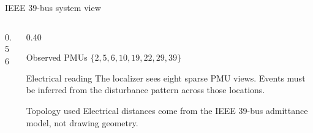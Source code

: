 \documentclass[aspectratio=169,10pt,t]{beamer}
\begin{document}
\begin{frame}{IEEE 39-bus system view}
\begin{columns}[T,totalwidth=\textwidth]
\begin{column}{0.56\textwidth}
{
}
\end{column}
\begin{column}{0.40\textwidth}
\scriptsize
\begin{block}{Observed PMUs}
\centering $\{2,5,6,10,19,22,29,39\}$
\end{block}
\begin{exampleblock}{Electrical reading}
The localizer sees eight sparse PMU views. Events must be inferred from the disturbance pattern across those locations.
\end{exampleblock}
\begin{alertblock}{Topology used}
Electrical distances come from the IEEE 39-bus admittance model, not drawing geometry.
\end{alertblock}
\end{column}
\end{columns}
\end{frame}
\end{document}
